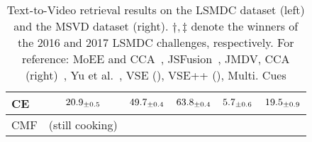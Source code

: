 \begin{table*}[ht]
\begin{minipage}{0.4\linewidth}
\begin{tabular}{l | c c c c c }
CE  & $ 20.9_{\pm0.5}$ & $ 49.7_{\pm0.4}$ & $ 63.8_{\pm0.4}$ & $ 5.7_{\pm0.6}$ & $ 19.5_{\pm0.9}$ \\
\hline

\hline
CMF & (still cooking) & & & \\
\hline \hline
\end{tabular}
\end{minipage}
\vspace{0.2cm}
\caption{\color{red}Text-to-Video retrieval results on the LSMDC dataset (left) and the MSVD dataset (right). $\dagger,\ddagger$ denote the winners of the 2016 and 2017 LSMDC challenges, respectively. For reference: MoEE and CCA~\cite{miech2018learning}, JSFusion~\cite{yu2018joint}, JMDV, CCA (right)~\cite{xu2015jointly}, Yu et al.~\cite{yu2016video}, VSE \cite{kiros2014unifying} (\cite{mithun2018learning}), VSE++ \cite{faghri2017vse} (\cite{mithun2018learning}), Multi. Cues \cite{mithun2018learning}  \color{black}}
\label{table:LSMDC-MSVD} 
\end{table*}
